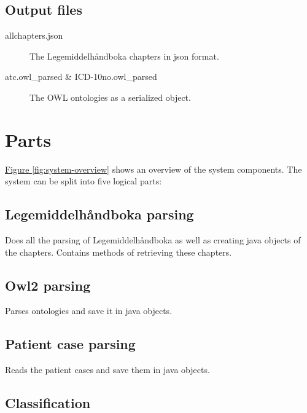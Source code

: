 \subsection*{Output files} %

\begin{description}
\item[allchapters.json]
The Legemiddelhåndboka chapters in json format.

\item[atc.owl\_parsed \& ICD-10no.owl\_parsed]
The OWL ontologies as a serialized object.
\end{description}


\section{Parts}
\label{sec:parts}

\hyperref[fig:system-overview]{Figure \ref*{fig:system-overview}} shows an
overview of the system components. The system can be split into five logical
parts:

\subsection*{Legemiddelhåndboka parsing}

Does all the parsing of Legemiddelhåndboka as well as creating java objects of
the chapters. Contains methods of retrieving these chapters.

\subsection*{Owl2 parsing}

Parses ontologies and save it in java objects.

\subsection*{Patient case parsing}

Reads the patient cases and save them in java objects.

\subsection*{Classification}

